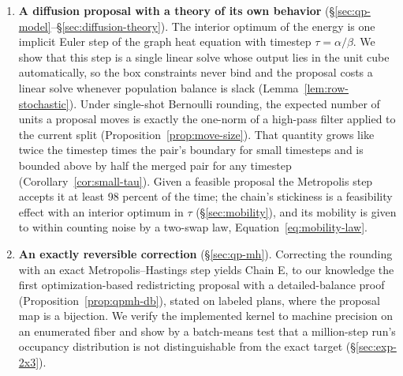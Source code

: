 \documentclass[11pt]{article}
\begin{document}
\begin{enumerate}
  \item \textbf{A diffusion proposal with a theory of its own
    behavior} (\S\ref{sec:qp-model}--\S\ref{sec:diffusion-theory}).
    The interior optimum of the energy is one implicit Euler step of
    the graph heat equation with timestep $\tau = \alpha/\beta$. We
    show that this step is a single linear solve whose output lies in
    the unit cube automatically, so the box constraints never bind
    and the proposal costs a linear solve whenever population balance
    is slack (Lemma~\ref{lem:row-stochastic}). Under single-shot
    Bernoulli rounding, the expected number of units a proposal moves
    is exactly the one-norm of a high-pass filter applied to the
    current split (Proposition~\ref{prop:move-size}). That quantity
    grows like twice the timestep times the pair's boundary for small
    timesteps and is bounded above by half the merged pair for any
    timestep (Corollary~\ref{cor:small-tau}). Given a feasible
    proposal the Metropolis step accepts it at least 98 percent of the
    time; the chain's stickiness is a feasibility effect with an
    interior optimum in $\tau$ (\S\ref{sec:mobility}), and its
    mobility is given to within counting noise by a two-swap law,
    Equation~\eqref{eq:mobility-law}.

  \item \textbf{An exactly reversible correction}
    (\S\ref{sec:qp-mh}). Correcting the rounding with an exact
    Metropolis--Hastings step yields Chain E, to our knowledge the
    first optimization-based redistricting proposal with a
    detailed-balance proof (Proposition~\ref{prop:qpmh-db}), stated
    on labeled plans, where the proposal map is a bijection. We
    verify the implemented kernel to machine precision on an
    enumerated fiber and show by a batch-means test that a
    million-step run's occupancy distribution is not distinguishable
    from the exact target (\S\ref{sec:exp-2x3}).


\end{enumerate}
\end{document}
